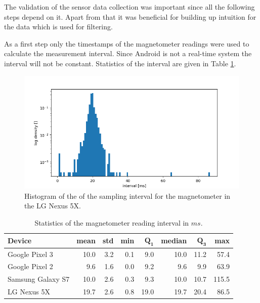 The validation of the sensor data collection was important since all the following steps depend on it. Apart from that it was beneficial for building up intuition for the data which is used for filtering.

As a first step only the timestamps of the magnetometer readings were used to calculate the measurement interval. Since Android is not a real-time system the interval will not be constant. Statistics of the interval are given in Table \ref{tbl:mag_interval}.

\begin{figure}[hbt!]
    \centering
    \includegraphics[width=1.0\textwidth]{figures/interval_nexus5.png}
    \caption{Histogram of the of the sampling interval for the magnetometer in the LG Nexus 5X.}
    \label{fig:interval}
\end{figure}

\begin{table}[h]
    \centering
    \begin{tabular}{ | l | r | r | r | r | r | r | r | }
    \hline
    \textbf{Device}   & \textbf{mean} & \textbf{std} & \textbf{min} & $\bm{Q_1}$ & \textbf{median} & $\bm{Q_3}$ & \textbf{max} \\ \hline
    Google Pixel 3    & 10.0 & 3.2 & 0.1 &  9.0 & 10.0 & 11.2 &  57.4 \\ \hline
    Google Pixel 2    &  9.6 & 1.6 & 0.0 &  9.2 &  9.6 &  9.9 &  63.9 \\ \hline
    Samsung Galaxy S7 & 10.0 & 2.6 & 0.3 &  9.3 & 10.0 & 10.7 & 115.5 \\ \hline
    LG Nexus 5X       & 19.7 & 2.6 & 0.8 & 19.0 & 19.7 & 20.4 &  86.5 \\ \hline
    \end{tabular}
    \caption{Statistics of the magnetometer reading interval in $ms$.}
    \label{tbl:mag_interval}
\end{table}

